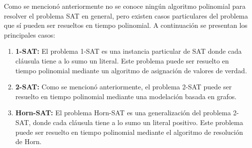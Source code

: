 \documentclass{article}
\begin{document}
Como se mencionó anteriormente no se conoce ningún algoritmo polinomial para resolver el problema SAT en general, pero
existen casos particulares del problema que sí pueden ser resueltos en tiempo polinomial. A continuación se presentan los
principales casos:

\begin{enumerate}
      \item \textbf{1-SAT:} El problema 1-SAT es una instancia particular de SAT donde cada cláusula tiene a lo sumo un literal.
            Este problema puede ser resuelto en tiempo polinomial mediante un algoritmo de asignación de valores de verdad.
      \item \textbf{2-SAT:} Como se mencionó anteriormente, el problema 2-SAT puede ser resuelto en tiempo polinomial mediante
            una modelación basada en grafos.
      \item \textbf{Horn-SAT:} El problema Horn-SAT es una generalización del problema 2-SAT, donde cada cláusula tiene a lo sumo
            un literal positivo. Este problema puede ser resuelto en tiempo polinomial mediante el algoritmo de resolución de Horn.
\end{enumerate}
\end{document}
